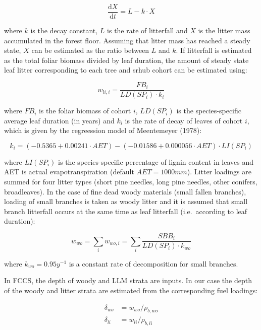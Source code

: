 \documentclass[]{book}
\begin{document}
\begin{equation}
\frac{\mathrm{d}X}{\mathrm{d}t} = L - k\cdot X
\end{equation}

where \(k\) is the decay constant, \(L\) is the rate of litterfall and
\(X\) is the litter mass accumulated in the forest floor. Assuming that
litter mass has reached a steady state, \(X\) can be estimated as the
ratio between \(L\) and \(k\). If litterfall is estimated as the total
foliar biomass divided by leaf duration, the amount of steady state leaf
litter corresponding to each tree and srhub cohort can be estimated
using:

\begin{equation}
w_{li, i} = \frac{FB_i}{LD(SP_i) \cdot k_i}
\end{equation}

where \(FB_i\) is the foliar biomass of cohort \(i\), \(LD(SP_i)\) is
the species-specific average leaf duration (in years) and \(k_i\) is the
rate of decay of leaves of cohort \(i\), which is given by the
regreession model of Meentemeyer (1978):

\begin{equation}
k_i = (-0.5365+0.00241\cdot AET) - (-0.01586+0.000056\cdot AET) \cdot LI(SP_i) 
\end{equation}

where \(LI(SP_i)\) is the species-specific percentage of lignin content
in leaves and AET is actual evapotranspiration (default
\(AET = 1000 mm\)). Litter loadings are summed for four litter types
(short pine needles, long pine needles, other conifers, broadleaves). In
the case of fine dead woody materials (small fallen branches), loading
of small branches is taken as woody litter and it is assumed that small
branch litterfall occurs at the same time as leaf litterfall
(i.e.~according to leaf duration):

\begin{equation}
w_{wo} = \sum_{i}{w_{wo, i}} = \sum_{i}{\frac{SBB_i}{LD(SP_i)\cdot k_{wo}} }
\end{equation}

where \(k_{wo} = 0.95 y^{-1}\) is a constant rate of decomposition for
small branches.

In FCCS, the depth of woody and LLM strata are inputs. In our case the
depth of the woody and litter strata are estimated from the
corresponding fuel loadings:

\begin{eqnarray}
\delta_{wo} &= w_{wo}/\rho_{b, wo}\\
\delta_{li} &= w_{li}/\rho_{b, li}
\end{eqnarray}
\end{document}
